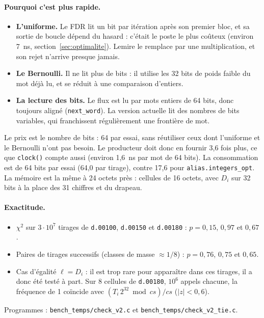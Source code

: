 \documentclass[11pt,a4paper]{article}
\newcommand{\code}[1]{\texttt{#1}}
\newcommand{\cs}{\mathit{cs}}
\begin{document}
\paragraph{Pourquoi c'est plus rapide.}
\begin{itemize}
\item \textbf{L'uniforme.} Le FDR lit un bit par itération après son premier bloc, et sa
  sortie de boucle dépend du hasard : c'était le poste le plus coûteux (environ 7~ns,
  section~\ref{sec:optimalite}). Lemire le remplace par une multiplication, et son
  rejet n'arrive presque jamais.
\item \textbf{Le Bernoulli.} Il ne lit plus de bits : il utilise les 32 bits de poids
  faible du mot déjà lu, et se réduit à une comparaison d'entiers.
\item \textbf{La lecture des bits.} Le flux est lu par mots entiers de 64 bits, donc
  toujours aligné (\code{next\_word}). La version actuelle lit des nombres de bits
  variables, qui franchissent régulièrement une frontière de mot.
\end{itemize}
Le prix est le nombre de bits : 64 par essai, sans réutiliser ceux dont l'uniforme et le
Bernoulli n'ont pas besoin. Le producteur doit donc en fournir 3,6 fois plus, ce que
\code{clock()} compte aussi (environ 1,6~ns par mot de 64 bits).
La consommation est de 64 bits par essai (64,0 par tirage), contre 17,6 pour
\code{alias.integers\_opt}. La mémoire est la même à 24 octets près : cellules de
16 octets, avec $D_i$ sur 32 bits à la place des 31 chiffres et du drapeau.

\paragraph{Exactitude.}
\begin{itemize}
\item $\chi^2$ sur $3\cdot 10^7$ tirages de \code{d.00100}, \code{d.00150} et
  \code{d.00180} : $p = 0{,}15$, $0{,}97$ et $0{,}67$.
\item Paires de tirages successifs (classes de masse $\approx 1/8$) : $p = 0{,}76$,
  $0{,}75$ et $0{,}65$.
\item Cas d'égalité $\ell = D_i$ : il est trop rare pour apparaître dans ces tirages,
  il a donc été testé à part. Sur 8 cellules de \code{d.00180}, $10^6$ appels chacune,
  la fréquence de 1 coïncide avec $(T_i\,2^{32} \bmod \cs)/\cs$ ($|z| < 0{,}6$).
\end{itemize}
Programmes : \code{bench\_temps/check\_v2.c} et \code{bench\_temps/check\_v2\_tie.c}.
\end{document}
